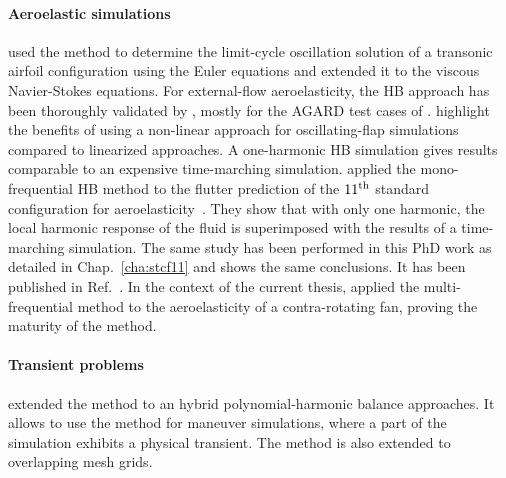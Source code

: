 \paragraph{Aeroelastic simulations}
\citet{Thomas2002a} used the method to
determine the limit-cycle oscillation solution
of a transonic airfoil configuration using the
Euler equations and \citet{Thomas2004b} extended
it to the viscous Navier-Stokes equations.
For external-flow aeroelasticity, the HB approach has 
been thoroughly 
validated by \citet{Gopinath2005, JSicot2008, Woodgate2009, JDufour2009}, 
mostly for the AGARD test cases of \citet{Davis1982}. 
\citet{JDufour2009} highlight the benefits of using a 
non-linear approach for oscillating-flap simulations
compared to linearized approaches. A one-harmonic HB simulation
gives results comparable to an expensive time-marching simulation.
\citet{Huang2013} applied the mono-frequential
HB method to the flutter prediction of the 
$11\textsuperscript{th}$ 
standard configuration for aeroelasticity~\cite{Fransson1999}.
They show that with only one harmonic, the local
harmonic response of the fluid is superimposed
with the results of a time-marching simulation.
The same study has been performed in this PhD work
as detailed in Chap.~\ref{cha:stcf11}
and shows the same conclusions. It has been
published in Ref.~\cite{JSicot2012}.
In the context of the current thesis,
\citet{JSicot2013} applied the multi-frequential method to the
aeroelasticity of a contra-rotating fan, proving
the maturity of the method.


\paragraph{Transient problems}
\citet{Mavriplis2012} extended the method to 
an hybrid polynomial-harmonic balance approaches. 
It allows to use the method for maneuver simulations, 
where a part of the simulation exhibits a physical transient.
The method is also extended to overlapping mesh grids.

